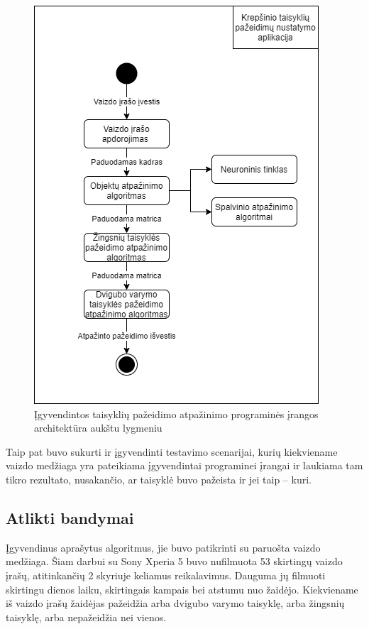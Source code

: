 \documentclass{VUMIFPSbakalaurinis}
\begin{document}
\begin{figure}[H]
	\centering
	\includegraphics[scale=0.6]{img/program_architecture}
	\caption{Įgyvendintos taisyklių pažeidimo atpažinimo programinės įrangos architektūra aukštu lygmeniu}
	\label{img:program_architecture}
\end{figure}

Taip pat buvo sukurti ir įgyvendinti testavimo scenarijai, kurių kiekviename vaizdo medžiaga yra pateikiama įgyvendintai programinei įrangai ir laukiama tam tikro rezultato, nusakančio, ar taisyklė buvo pažeista ir jei taip – kuri.  

\subsection{Atlikti bandymai}
Įgyvendinus aprašytus algoritmus, jie buvo patikrinti su paruošta vaizdo medžiaga. Šiam darbui su Sony Xperia 5 buvo nufilmuota 53 skirtingų vaizdo įrašų, atitinkančių 2 skyriuje keliamus reikalavimus. Dauguma jų filmuoti skirtingu dienos laiku, skirtingais kampais bei atstumu nuo žaidėjo. Kiekviename iš vaizdo įrašų žaidėjas pažeidžia arba dvigubo varymo taisyklę, arba žingsnių taisyklę, arba nepažeidžia nei vienos.  
\end{document}
